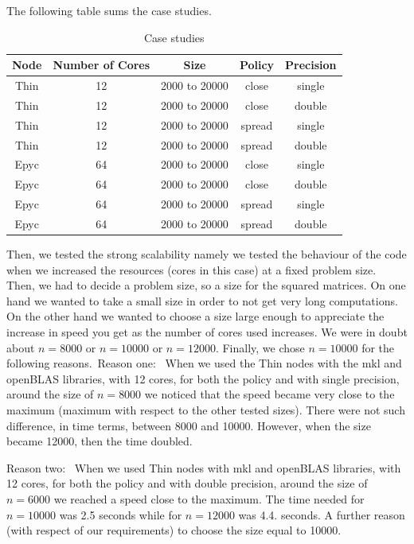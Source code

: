 \documentclass[12pt, titlepage]{report}
\begin{document}
The following table sums the case studies.

\begin{table}[h]
\centering
\begin{tabular}{|c|c|c|c|c|}
\hline
\textbf{Node} & \textbf{Number of Cores} & \textbf{Size} & \textbf{Policy} & \textbf{Precision} \\
\hline
Thin & 12 & 2000 to 20000 & close & single \\
Thin & 12 & 2000 to 20000 & close & double \\
Thin & 12 & 2000 to 20000 & spread & single \\
Thin & 12 & 2000 to 20000 & spread & double \\
\hline
Epyc & 64 & 2000 to 20000 & close & single \\
Epyc & 64 & 2000 to 20000 & close & double \\
Epyc & 64 & 2000 to 20000 & spread & single \\
Epyc & 64 & 2000 to 20000 & spread & double \\
\hline
\end{tabular}
\caption{Case studies}
\end{table}

Then, we tested the strong scalability namely we tested the behaviour of the code when we increased the resources (cores in this case) at a fixed problem size.
Then, we had to decide a problem size, so a size for the squared matrices. 
On one hand we wanted to take a small size in order to not get very long computations. On the other hand we wanted to choose a size large enough to appreciate the increase in speed you get as the number of cores used increases. 
We were in doubt about $ n = 8000$ or $ n= 10000$ or $ n= 12000$.
Finally, we chose $ n = 10000 $ for the following reasons.\
Reason one: \
When we used the Thin nodes with the mkl and openBLAS libraries, with 12 cores, for both the policy and with single precision, around the size of $ n = 8000 $ we noticed that the speed became very close to the maximum (maximum with respect to the other tested sizes). There were not such difference, in time terms, between 8000 and 10000. However, when the size became 12000, then the time doubled.  

Reason two: \
When we used Thin nodes with mkl and openBLAS libraries, with 12 cores, for both the policy and with double precision, around the size of $ n = 6000 $ we reached a speed close to the maximum. The time needed for $ n = 10000 $ was 2.5 seconds while for $ n = 12000 $ was 4.4. seconds. A further reason (with respect of our requirements) to choose the size equal to 10000.
\end{document}
